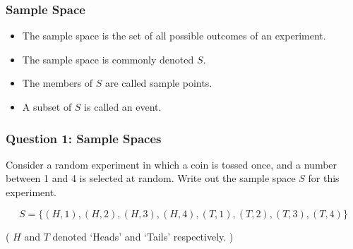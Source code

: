 
\frametitle{Sample Space}

\begin{itemize}
\item The sample space is the set of all possible outcomes of an experiment.
\item The sample space is commonly denoted $S$.
\item The members of $S$ are called sample points.
\item A subset of $S$ is called an event.
\end{itemize}


\frametitle{Question 1: Sample Spaces }
Consider a random experiment in which a coin is tossed once, and a number between 1 and 4 is selected at random.
Write out the sample space $S$ for this experiment.

\bigskip

\[ S = \{(H,1),(H,2),(H,3),(H,4),(T,1),(T,2),(T,3),(T,4)\} \]

( $H$ and $T$ denoted `Heads' and `Tails' respectively. )

